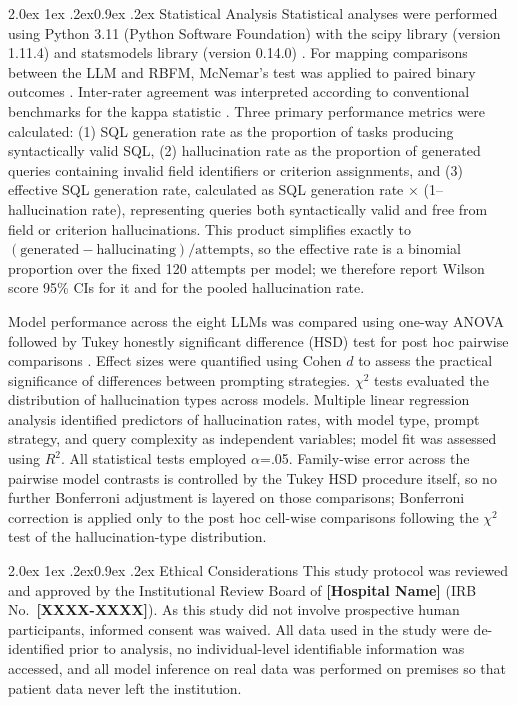 \documentclass[10pt,twocolumn]{article}
\makeatletter
\renewcommand\subsection{\@startsection{subsection}{2}{\z@}%
  {2.0ex \@plus 1ex \@minus .2ex}{0.9ex \@plus .2ex}%
  {\normalfont\normalsize\bfseries}}
\newcommand{\PH}[1]{{\color{red}\textbf{[#1]}}}
\makeatother
\begin{document}
\subsection{Statistical Analysis}
Statistical analyses were performed using Python 3.11 (Python Software
Foundation) with the scipy library (version 1.11.4) \cite{scipy2020} and
statsmodels library (version 0.14.0) \cite{statsmodels2010}. For mapping
comparisons between the LLM and RBFM, McNemar's test was applied to paired binary
outcomes \cite{mcnemar1947}. Inter-rater agreement was interpreted according to
conventional benchmarks for the kappa statistic \cite{landis1977}. Three primary performance
metrics were calculated: (1) SQL generation rate as the proportion of tasks
producing syntactically valid SQL, (2) hallucination rate as the proportion of
generated queries containing invalid field identifiers or criterion assignments,
and (3) effective SQL generation rate, calculated as SQL generation rate $\times$ (1--hallucination rate), representing queries both syntactically valid and free from field or criterion hallucinations. This product simplifies exactly to $(\text{generated}-\text{hallucinating})/\text{attempts}$, so the effective rate is a binomial proportion over the fixed 120 attempts per model; we therefore report Wilson score 95\% CIs for it and for the pooled hallucination rate.

Model performance across the eight LLMs was compared using one-way ANOVA
followed by Tukey honestly significant difference (HSD) test for post hoc
pairwise comparisons \cite{tukey1949}. Effect sizes were quantified using Cohen $d$ to assess the
practical significance of differences between prompting strategies. $\chi^2$
tests evaluated the distribution of hallucination types across models. Multiple
linear regression analysis identified predictors of hallucination rates, with
model type, prompt strategy, and query complexity as independent variables;
model fit was assessed using $R^2$. All statistical tests employed $\alpha$=.05. Family-wise error across the pairwise model contrasts is controlled by the Tukey HSD procedure itself, so no further Bonferroni adjustment is layered on those comparisons; Bonferroni correction is applied only to the post hoc cell-wise comparisons following the $\chi^2$ test of the hallucination-type distribution.

\subsection{Ethical Considerations}
This study protocol was reviewed and approved by the Institutional Review Board
of \PH{Hospital Name} (IRB No.\ \PH{XXXX-XXXX}). As this study did not involve
prospective human participants, informed consent was waived. All data used in
the study were de-identified prior to analysis, no individual-level identifiable
information was accessed, and all model inference on real data was performed on
premises so that patient data never left the institution.
\end{document}
